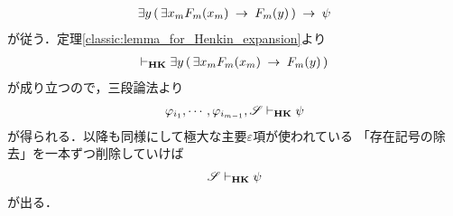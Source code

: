 \begin{sketch}
\begin{align}
			\exists y\, (\, \exists x_{m} F_{m}(x_{m}) \hspace{0.25em}\rightarrow\hspace{0.25em} F_{m}(y)\, ) \hspace{0.25em}\rightarrow\hspace{0.25em} \psi
		\end{align}
		が従う．定理\ref{classic:lemma_for_Henkin_expansion}より
		\begin{align}
			\vdash_{{\scriptsize \mbox{{\bf HK}}}} 
			\exists y\, (\, \exists x_{m} F_{m}(x_{m}) \hspace{0.25em}\rightarrow\hspace{0.25em} F_{m}(y)\, )
		\end{align}
		が成り立つので，三段論法より
		\begin{align}
			\varphi_{i_{1}},\cdots,\varphi_{i_{m-1}},\mathscr{S} 
			\vdash_{{\scriptsize \mbox{{\bf HK}}}} \psi
		\end{align}
		が得られる．以降も同様にして極大な主要$\varepsilon$項が使われている
		「存在記号の除去」を一本ずつ削除していけば
		\begin{align}
			\mathscr{S} \vdash_{{\scriptsize \mbox{{\bf HK}}}} \psi
		\end{align}
		が出る．
		\QED
	\end{sketch}
	
